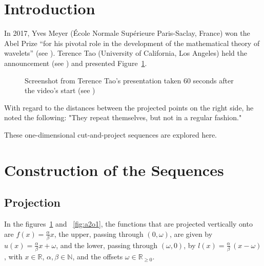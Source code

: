 \documentclass[11pt]{article}
\theoremstyle{remark}
\begin{document}
\section{Introduction}

In 2017, Yves Meyer (École Normale Supérieure Paris-Saclay, France) won the Abel Prize “for his pivotal role in the development of the mathematical theory of wavelets” (see \cite{AbelPriceYvesMeyer}).
%
Terence Tao (University of California, Los Angeles) held the announcement (see \cite{SpeechTao}) and presented Figure~\ref{fig:MeyerSets}.
%
\begin{figure}[htbp]
    \centering
    \caption{Screenshot from Terence Tao's presentation taken 60 seconds after the video's start (see \cite{SpeechTao})}
    \label{fig:MeyerSets}
\end{figure}
%
With regard to the distances between the projected points on the right side, he noted the following: "They repeat themselves, but not in a regular fashion."

These one-dimensional cut-and-project sequences are explored here.

\section{Construction of the Sequences}

\subsection{Projection}

In the figures~\ref{fig:MeyerSets} and ~\ref{fig:a2o1}, 
the functions that are projected vertically onto are $f(x) = \frac{\alpha}{\beta} x$, 
the upper, passing through $(0, \omega)$, are given by $u(x) = \frac{\alpha}{\beta} x + \omega$, 
and the lower, passing through $(\omega, 0)$, by $l(x) = \frac{\alpha}{\beta} \, (x - \omega)$, 
with $x \in \mathbb{R}$, $\alpha, \beta \in \mathbb{N}$, and the offsets $\omega \in \mathbb{R}_{\ge 0}$.
\end{document}
